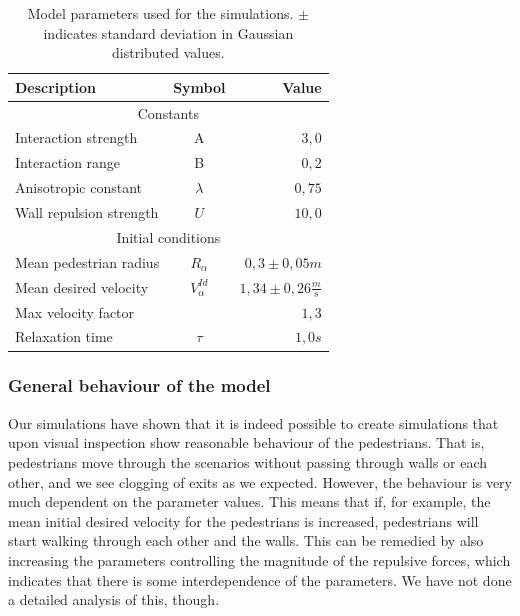 \begin{table}[ht]
    \begin{center}
        \begin{tabular}{l c r}
            \toprule
            \textbf{Description} & \textbf{Symbol} & \textbf{Value} \\
            \midrule
            \multicolumn{3}{c}{\textsf{Constants}}\\
            Interaction strength & A & $3,0$ \\
            Interaction range & B & $0,2$ \\
            Anisotropic constant & $\lambda$ & $0,75$ \\
            Wall repulsion strength & $U$ &  $10,0$ \\
            \midrule
            \multicolumn{3}{c}{\textsf{Initial conditions}}\\
            Mean pedestrian radius & $R_\alpha$ & $0,3 \pm 0,05 m$\\
            Mean desired velocity &  $V^{Id}_\alpha$ &  $1,34 \pm 0,26
            \frac{m}{s}$ \\
            Max velocity factor &  &  $1,3$ \\
            Relaxation time & $\tau$ & $1,0 s$\\
            \bottomrule
        \end{tabular}
        \caption[Model parameters]{Model parameters used for the simulations.  
        $\pm$ indicates standard deviation in Gaussian distributed values.}
        \label{tbl:parameter-settings}
    \end{center}
\end{table}

\subsubsection{General behaviour of the model}
Our simulations have shown that it is indeed possible to create simulations 
that upon visual inspection show reasonable behaviour of the pedestrians. That 
is, pedestrians move through the scenarios without passing through walls or 
each other, and we see clogging of exits as we expected. However, the 
behaviour is very much dependent on the parameter values. This means that if, 
for example, the mean initial desired velocity for the pedestrians is 
increased, pedestrians will start walking through each other and the walls.  
This can be remedied by also increasing the parameters controlling the 
magnitude of the repulsive forces, which indicates that there is some 
interdependence of the parameters. We have not done a detailed analysis of 
this, though.

